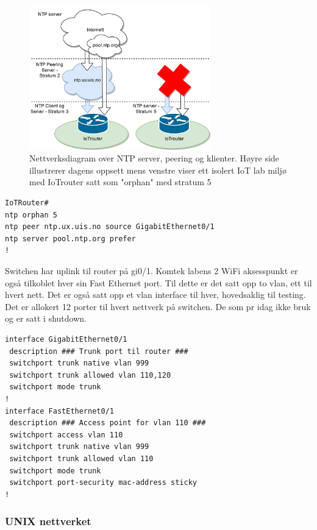 \documentclass{article}
\begin{document}
\lstset{breaklines=true}
\begin{figure}[!ht]
  \centering
      \includegraphics[width=0.7\textwidth]{NTP}
  \caption{Nettverksdiagram over NTP server, peering og klienter. Høyre side illustrerer dagens oppsett mens venstre viser ett isolert IoT lab miljø med IoTrouter satt som "orphan" med stratum 5}
\end{figure}

\lstset{breaklines=true}
\begin{verbatim}
IoTRouter#
ntp orphan 5
ntp peer ntp.ux.uis.no source GigabitEthernet0/1
ntp server pool.ntp.org prefer
!
\end{verbatim}

Switchen har uplink til router på gi0/1. Komtek labens 2 WiFi aksesspunkt er også tilkoblet hver sin Fast Ethernet port. Til dette er det satt opp to vlan, ett til hvert nett. Det er også satt opp et vlan interface til hver, hovedsaklig til testing. Det er allokert 12 porter til hvert nettverk på switchen. De som pr idag ikke bruk og er satt i shutdown.

\begin{verbatim}
interface GigabitEthernet0/1
 description ### Trunk port til router ###
 switchport trunk native vlan 999
 switchport trunk allowed vlan 110,120
 switchport mode trunk
!
interface FastEthernet0/1
 description ### Access point for vlan 110 ###
 switchport access vlan 110
 switchport trunk native vlan 999
 switchport trunk allowed vlan 110
 switchport mode trunk
 switchport port-security mac-address sticky
!
\end{verbatim}


\newpage
\subsubsection{UNIX nettverket}
\end{document}
